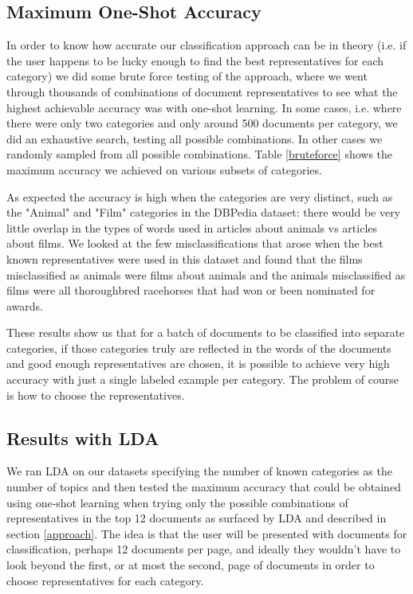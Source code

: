 \subsection{Maximum One-Shot Accuracy}
In order to know how accurate our classification approach can be in theory (i.e. if the user happens to be lucky enough to find the best representatives for each category) we did some brute force testing of the approach, where we went through thousands of combinations of document representatives to see what the highest achievable accuracy was with one-shot learning. In some cases, i.e. where there were only two categories and only around 500 documents per category, we did an exhaustive search, testing all possible combinations. In other cases we randomly sampled from all possible combinations. Table \ref{bruteforce} shows the maximum accuracy we achieved on various subsets of categories.

As expected the accuracy is high when the categories are very distinct, such as the "Animal" and "Film" categories in the DBPedia dataset: there would be very little overlap in the types of words used in articles about animals vs articles about films. We looked at the few misclassifications that arose when the best known representatives were used in this dataset and found that the films misclassified as animals were films about animals and the animals misclassified as films were all thoroughbred racehorses that had won or been nominated for awards.

These results show us that for a batch of documents to be classified into separate categories, if those categories truly are reflected in the words of the documents and good enough representatives are chosen, it is possible to achieve very high accuracy with just a single labeled example per category. The problem of course is how to choose the representatives.

\subsection{Results with LDA}
We ran LDA on our datasets specifying the number of known categories as the number of topics and then tested the maximum accuracy that could be obtained using one-shot learning when trying only the possible combinations of representatives in the top 12 documents as surfaced by LDA and described in section \ref{approach}. The idea is that the user will be presented with documents for classification, perhaps 12 documents per page, and ideally they wouldn't have to look beyond the first, or at most the second, page of documents in order to choose representatives for each category.

